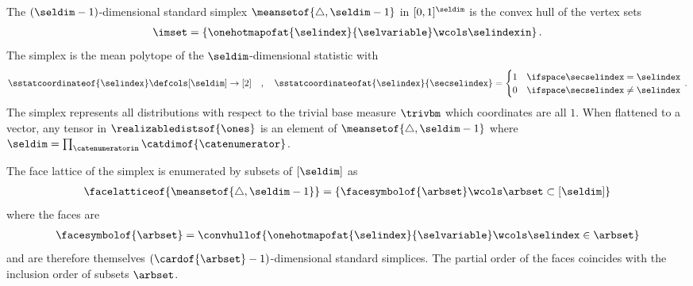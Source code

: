 \begin{example}[Simplices]
    \label{exa:simplexFaces}
    The $(\seldim-1)$-dimensional standard simplex $\meansetof{\triangle,\seldim-1}$ in $[0,1]^{\seldim}$ is the convex hull of the vertex sets
    \begin{align*}
        \imset = \{\onehotmapofat{\selindex}{\selvariable} \wcols\selindexin\} \, .
    \end{align*}
    The simplex is the mean polytope of the $\seldim$-dimensional statistic with
    \begin{align*}
        \sstatcoordinateof{\selindex} \defcols [\seldim] \rightarrow [2] \quad, \quad
        \sstatcoordinateofat{\selindex}{\secselindex}
        = \begin{cases}
              1 & \ifspace \secselindex = \selindex \\
              0 & \ifspace \secselindex \neq \selindex
        \end{cases} \, .
    \end{align*}
    The simplex represents all distributions with respect to the trivial base measure $\trivbm$ which coordinates are all $1$.
    When flattened to a vector, any tensor in $\realizabledistsof{\ones}$ is an element of $\meansetof{\triangle,\seldim-1}$ where $\seldim=\prod_{\catenumeratorin}\catdimof{\catenumerator}$.

    The face lattice of the simplex is enumerated by subsets of $[\seldim]$ as
    \begin{align*}
        \facelatticeof{\meansetof{\triangle,\seldim-1}}
        = \{\facesymbolof{\arbset}\wcols\arbset\subset[\seldim]\}
    \end{align*}
    where the faces are
    \begin{align*}
        \facesymbolof{\arbset}
        = \convhullof{\onehotmapofat{\selindex}{\selvariable} \wcols\selindex\in\arbset}
    \end{align*}
    and are therefore themselves $(\cardof{\arbset}-1)$-dimensional standard simplices.
    The partial order of the faces coincides with the inclusion order of subsets $\arbset$.
\end{example}
